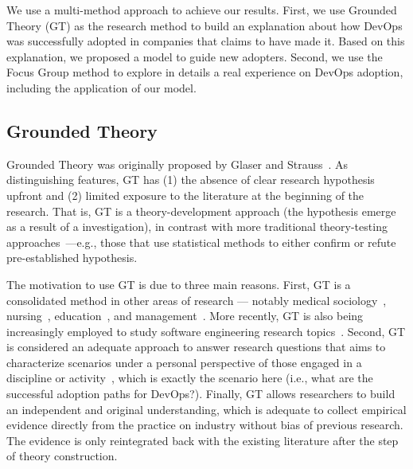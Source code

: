 
We use a multi-method approach to achieve our results. First, we use Grounded
Theory (GT) as the research method to build an explanation about how DevOps was
successfully adopted in companies that claims to have made it. Based on this
explanation, we proposed a model to guide new adopters. Second, we use
the Focus Group method to explore in details a real experience on DevOps adoption,
including the application of our model.

\subsection{Grounded Theory}\label{sec:gt}

Grounded Theory was
originally proposed by Glaser and Strauss~\cite{glase1967discovery}.
As distinguishing features, GT has (1) the absence of clear research hypothesis upfront
and (2) limited exposure to the literature at the beginning of the research. That is, GT
is a theory-development approach (the hypothesis emerge as a result of
a investigation), in contrast with more traditional
theory-testing approaches~\cite{coleman2007using}---e.g., those that
use statistical methods to either confirm or refute pre-established hypothesis.

The motivation to use GT is due to three main reasons. First, GT is a consolidated
method in other areas of research --- notably medical
sociology~\cite{gt_medical_sociology}, nursing~\cite{barnsteiner2002using}, education~\cite{gt_education},
and management~\cite{gt_management}. More recently, GT is also being increasingly employed
to study software engineering research topics~\cite{hoda2017becoming,stol2016grounded,adolph2011using}. Second,
GT is considered an adequate approach to answer research questions that aims to
characterize scenarios under a personal perspective of those
engaged in a discipline or activity~\cite{barnsteiner2002using},
which is exactly the scenario here (i.e., what are the successful adoption paths for DevOps?). Finally,
GT allows researchers to build an independent and original understanding,
which is adequate to collect empirical evidence directly from the
practice on industry without bias of previous research. The evidence
is only reintegrated back with the existing literature after the step of
theory construction.

